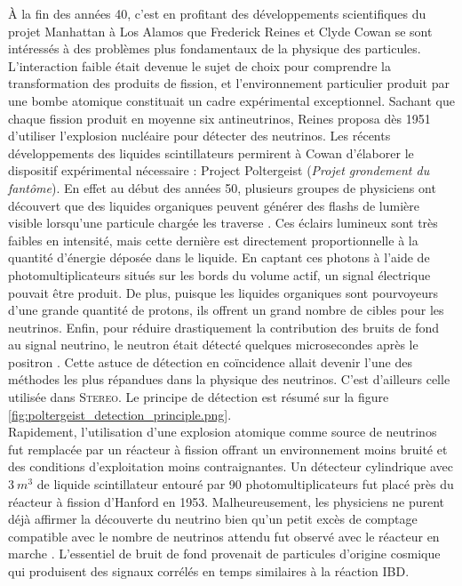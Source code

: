 À la fin des années 40, c'est en profitant des développements scientifiques du projet Manhattan à Los Alamos que Frederick Reines et Clyde Cowan se sont intéressés à des problèmes plus fondamentaux de la physique des particules. L'interaction faible était devenue le sujet de choix pour comprendre la transformation des produits de fission, et l'environnement particulier produit par une bombe atomique constituait un cadre expérimental exceptionnel. Sachant que chaque fission produit en moyenne six antineutrinos, Reines proposa dès 1951 d'utiliser l'explosion nucléaire pour détecter des neutrinos. Les récents développements des liquides scintillateurs permirent à Cowan d'élaborer le dispositif expérimental nécessaire : \og Project Poltergeist \fg{} (\textit{Projet grondement du fantôme}). En effet au début des années 50, plusieurs groupes de physiciens ont découvert que des liquides organiques peuvent générer des flashs de lumière visible lorsqu'une particule chargée les traverse \cite{Reynolds:1950knz}. Ces éclairs lumineux sont très faibles en intensité, mais cette dernière est directement proportionnelle à la quantité d'énergie déposée dans le liquide. En captant ces photons à l'aide de photomultiplicateurs situés sur les bords du volume actif, un signal électrique pouvait être produit. De plus, puisque les liquides organiques sont pourvoyeurs d'une grande quantité de protons, ils offrent un grand nombre de cibles pour les neutrinos. Enfin, pour réduire drastiquement la contribution des bruits de fond au signal neutrino, le neutron était détecté quelques microsecondes après le positron \cite{Reines:1953kf}\cite{Cowan:1953mw}\cite{Reines:1953pu}. Cette astuce de détection en coïncidence allait devenir l'une des méthodes les plus répandues dans la physique des neutrinos. C'est d'ailleurs celle utilisée dans \textsc{Stereo}. Le principe de détection est résumé sur la figure \ref{fig:poltergeist_detection_principle.png}.\\

Rapidement, l'utilisation d'une explosion atomique comme source de neutrinos fut remplacée par un réacteur à fission offrant un environnement moins bruité et des conditions d'exploitation moins contraignantes. Un détecteur cylindrique avec $\SI{3}{m^3}$ de liquide scintillateur entouré par 90 photomultiplicateurs fut placé près du réacteur à fission d'Hanford en 1953. Malheureusement, les physiciens ne purent déjà affirmer la découverte du neutrino bien qu'un petit excès de comptage compatible avec le nombre de neutrinos attendu fut observé avec le réacteur en marche \cite{Reines:1953pu}. L'essentiel de bruit de fond provenait de particules d'origine cosmique qui produisent des signaux corrélés en temps similaires à la réaction IBD.\\

